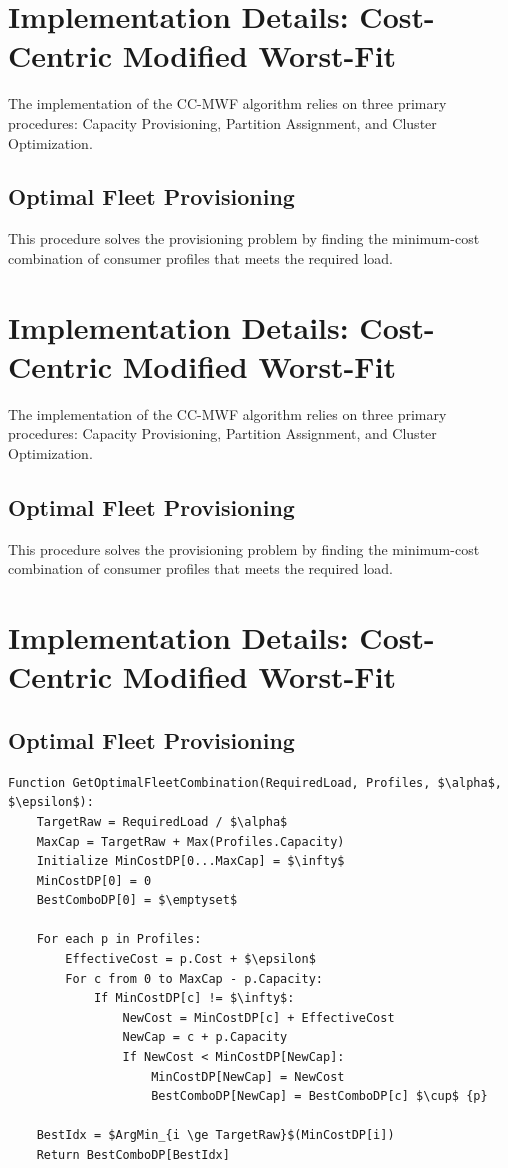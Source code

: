 ﻿\documentclass[conference]{IEEEtran}
\begin{document}
\section{Implementation Details: Cost-Centric Modified Worst-Fit}

The implementation of the CC-MWF algorithm relies on three primary procedures: Capacity Provisioning, Partition Assignment, and Cluster Optimization.

\subsection{Optimal Fleet Provisioning}
This procedure solves the provisioning problem by finding the minimum-cost combination of consumer profiles that meets the required load.

\section{Implementation Details: Cost-Centric Modified Worst-Fit}

The implementation of the CC-MWF algorithm relies on three primary procedures: Capacity Provisioning, Partition Assignment, and Cluster Optimization.

\subsection{Optimal Fleet Provisioning}
This procedure solves the provisioning problem by finding the minimum-cost combination of consumer profiles that meets the required load.

\section{Implementation Details: Cost-Centric Modified Worst-Fit}

\subsection{Optimal Fleet Provisioning}
\begin{lstlisting}[caption={GetOptimalFleetCombination}, mathescape=true]
Function GetOptimalFleetCombination(RequiredLoad, Profiles, $\alpha$, $\epsilon$):
    TargetRaw = RequiredLoad / $\alpha$
    MaxCap = TargetRaw + Max(Profiles.Capacity)
    Initialize MinCostDP[0...MaxCap] = $\infty$
    MinCostDP[0] = 0
    BestComboDP[0] = $\emptyset$

    For each p in Profiles:
        EffectiveCost = p.Cost + $\epsilon$
        For c from 0 to MaxCap - p.Capacity:
            If MinCostDP[c] != $\infty$:
                NewCost = MinCostDP[c] + EffectiveCost
                NewCap = c + p.Capacity
                If NewCost < MinCostDP[NewCap]:
                    MinCostDP[NewCap] = NewCost
                    BestComboDP[NewCap] = BestComboDP[c] $\cup$ {p}

    BestIdx = $ArgMin_{i \ge TargetRaw}$(MinCostDP[i])
    Return BestComboDP[BestIdx]
\end{lstlisting}
\end{document}
